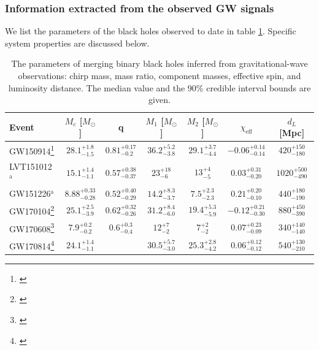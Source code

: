 \documentclass[iop,onecolumn]{revtex4}
\begin{document}
\subsubsection{Information extracted from the observed GW signals}
We list the parameters of the black holes observed to date in table \ref{table:BHmasses}. Specific system properties are discussed below.

\begin{table}
\begin{tabular}{lcccccc}
Event  & $M_c$ [$M_\odot$]  & q & $M_1$ [$M_\odot$]  & $M_2$ [$M_\odot$]  & $\chi_\textrm{eff}$ & $d_L$ [Mpc] \\
\hline
GW150914\footnote{\citet{BBH:O1}} & $28.1^{+1.8}_{-1.5}$ & $0.81^{+0.17}_{-0.2}$ & $36.2^{+5.2}_{-3.8}$ & $29.1^{+3.7}_{-4.4}$ & $-0.06^{+0.14}_{-0.14}$ & $420^{+150}_{-180}$\\
LVT151012$^\mathrm{a}$ & $15.1^{+1.4}_{-1.1}$ &$0.57^{+0.38}_{-0.37}$ &$23^{+18}_{-6}$ &$13^{+4}_{-5}$ &$0.03^{+0.31}_{-0.20}$ &$1020^{+500}_{-490}$\\
GW151226$^\mathrm{a}$ & $8.88^{+0.33}_{-0.28}$ &$0.52^{+0.40}_{-0.29}$ &$14.2^{+8.3}_{-3.7}$ &$7.5^{+2.3}_{-2.3}$ &$0.21^{+0.20}_{-0.10}$ &$440^{+180}_{-190}$ \\
GW170104\footnote{\citet{GW170104}} & $25.1^{+2.5}_{-3.9}$ &$0.62^{+0.32}_{-0.26}$ &$31.2^{+8.4}_{-6.0}$ &$19.4^{+5.3}_{-5.9}$ &$-0.12^{+0.21}_{-0.30}$ &$880^{+450}_{-390}$\\
GW170608\footnote{\citet{GW170608}} & $7.9^{+0.2}_{-0.2}$ &$0.6^{+0.3}_{-0.4}$ &$12^{+7}_{-2}$ &$7^{+2}_{-2}$ &$0.07^{+0.23}_{-0.09}$ &$340^{+140}_{-140}$ \\
GW170814\footnote{\citet{GW170814}} & $24.1^{+1.4}_{-1.1}$ & &$30.5^{+5.7}_{-3.0}$ &$25.3^{+2.8}_{-4.2}$ &$0.06^{+0.12}_{-0.12}$ & $540^{+130}_{-210}$ \\
\hline
\end{tabular}
\caption{The parameters of merging binary black holes inferred from gravitational-wave observations: chirp mass, mass ratio, component masses, effective spin, and luminosity distance.  The median value and the 90\% credible interval bounds are given.}\label{table:BHmasses}
\end{table}
\end{document}
